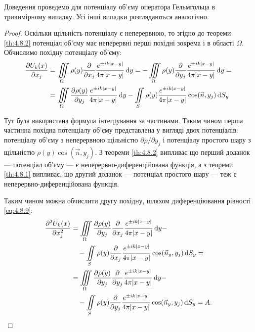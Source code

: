 Доведення проведемо для потенціалу об'єму оператора Гельмгольца в тривимірному випадку. Усі інші випадки розглядаються аналогічно.

\begin{proof}
	Оскільки щільність потенціалу є неперервною, то згідно до теореми \ref{th:4.8.2} потенціал об'єму має неперервні перші похідні зокрема і в області $\Omega$. Обчислимо похідну потенціалу об'єму:
	\begin{equation}
		\label{eq:4.8.9}
		\begin{aligned}
			\frac{\partial U_k(x)}{\partial x_j} &= \displaystyle\iiint\limits_\Omega \rho(y) \frac{\partial}{\partial x_j} \frac{e^{\pm i k |x - y|}}{4 \pi |x - y|} \mathop{}\!\mathrm{d} y = - \displaystyle\iiint\limits_\Omega \rho(y) \frac{\partial}{\partial y_j} \frac{e^{\pm i k |x - y|}}{4 \pi |x - y|} \mathop{}\!\mathrm{d} y = \\
			&= \displaystyle\iiint\limits_\Omega \frac{\partial \rho(y)}{\partial y_j} \frac{e^{\pm i k |x - y|}}{4 \pi |x - y|} \mathop{}\!\mathrm{d} y - \displaystyle\iint\limits_S \rho(y) \frac{e^{\pm i k |x - y|}}{4 \pi |x - y|} \cos(\vec n, y_j) \mathop{}\!\mathrm{d} S_y
		\end{aligned}
	\end{equation}

	Тут була використана формула інтегрування за частинами. Таким чином перша частинна похідна потенціалу об'єму представлена у вигляді двох потенціалів: потенціалу об'єму з неперервною щільністю $\partial \rho / \partial y_j$ і потенціалу простого шару з щільністю $\rho(y) \cos(\vec n, y_j)$. З теореми \ref{th:4.8.2} випливає що перший доданок --- потенціал об'єму --- є неперервно-диференційована функція, а з теореми \ref{th:4.8.1} випливає, що другий доданок --- потенціал простого шару --- теж є неперервно-диференційована функція. \medskip

	Таким чином можна обчислити другу похідну, шляхом диференціювання рівності \eqref{eq:4.8.9}:
	\begin{equation}
		\begin{aligned}
			\frac{\partial^2 U_k(x)}{\partial x_j^2} &= \displaystyle\iiint\limits_\Omega \frac{\partial \rho(y)}{\partial y_j} \frac{\partial}{\partial x_j} \frac{e^{\pm i k |x - y|}}{4 \pi |x - y|} \mathop{}\!\mathrm{d} y - \\
			& \quad - \displaystyle\iint\limits_S \rho(y) \frac{\partial}{\partial x_j} \frac{e^{\pm i k |x - y|}}{4 \pi |x - y|} \cos(\vec n_y, y_j) \mathop{}\!\mathrm{d} S_y = \\
			&= \displaystyle\iiint\limits_\Omega \frac{\partial \rho(y)}{\partial y_j} \frac{\partial}{\partial y_j} \frac{e^{\pm i k |x - y|}}{4 \pi |x - y|} \mathop{}\!\mathrm{d} y - \\
			& \quad - \displaystyle\iint\limits_S \rho(y) \frac{\partial}{\partial y_j} \frac{e^{\pm i k |x - y|}}{4 \pi |x - y|} \cos(\vec n_y, y_j) \mathop{}\!\mathrm{d} S_y = A.
		\end{aligned}
	\end{equation}


\end{proof}
